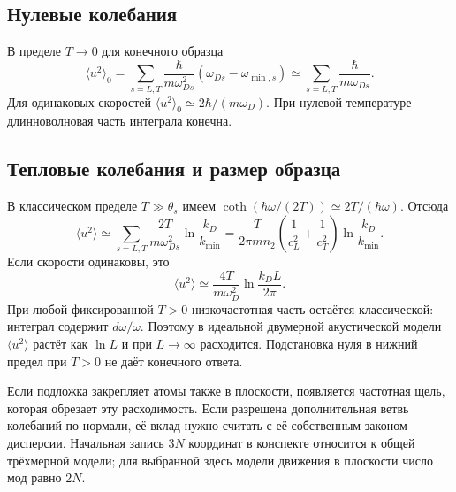 \documentclass[../final.tex]{subfiles}
\begin{document}
\subsection*{Нулевые колебания}
В пределе $T\to0$ для конечного образца
\[
 \langle u^2\rangle_0=
 \sum_{s=L,T}\frac{\hbar}{m\omega_{Ds}^2}
 (\omega_{Ds}-\omega_{\min,s})
 \simeq\sum_{s=L,T}\frac{\hbar}{m\omega_{Ds}}.
\]
Для одинаковых скоростей $\langle u^2\rangle_0\simeq2\hbar/(m\omega_D)$.
При нулевой температуре длинноволновая часть интеграла конечна.

\subsection*{Тепловые колебания и размер образца}
В классическом пределе $T\gg\theta_s$ имеем
$\coth(\hbar\omega/(2T))\simeq2T/(\hbar\omega)$. Отсюда
\[
 \boxed{\langle u^2\rangle\simeq
 \sum_{s=L,T}\frac{2T}{m\omega_{Ds}^2}
 \ln\frac{k_D}{k_{\min}}
 =\frac{T}{2\pi m n_2}
 \left(\frac1{c_L^2}+\frac1{c_T^2}\right)
 \ln\frac{k_D}{k_{\min}}}.
\]
Если скорости одинаковы, это
\[
 \langle u^2\rangle\simeq\frac{4T}{m\omega_D^2}
 \ln\frac{k_DL}{2\pi}.
\]
При любой фиксированной $T>0$ низкочастотная часть остаётся
классической: интеграл содержит $d\omega/\omega$.
Поэтому в идеальной двумерной акустической модели
$\langle u^2\rangle$ растёт как $\ln L$ и при $L\to\infty$
расходится. Подстановка нуля в нижний предел при $T>0$
не даёт конечного ответа.

Если подложка закрепляет атомы также в плоскости, появляется
частотная щель, которая обрезает эту расходимость.
Если разрешена дополнительная ветвь колебаний по нормали,
её вклад нужно считать с её собственным законом дисперсии.
Начальная запись $3N$ координат в конспекте относится к общей
трёхмерной модели; для выбранной здесь модели движения в плоскости
число мод равно $2N$.
\end{document}
